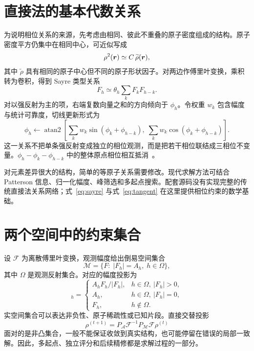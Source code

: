 \section{直接法的基本代数关系}
为说明相位关系的来源，先考虑由相同、彼此不重叠的原子密度组成的结构。原子密度平方仍集中在相同中心，可近似写成
\begin{equation}
\rho^2(\bm{r})\simeq C\,\widetilde\rho(\bm{r}),
\end{equation}
其中 $\widetilde\rho$ 具有相同的原子中心但不同的原子形状因子。对两边作傅里叶变换，乘积转为卷积，得到 Sayre 类型关系~\cite{sayre1952}
\begin{equation}
F_h\simeq\theta_h\sum_k F_kF_{h-k}.
\label{eq:sayre}
\end{equation}
对以强反射为主的项，右端复数向量之和的方向倾向于 $\phi_h$。令权重 $w_k$ 包含幅度与统计可靠度，切线更新形式为
\begin{equation}
\phi_h\leftarrow\operatorname{atan2}\left[
\sum_kw_k\sin(\phi_k+\phi_{h-k}),\;
\sum_kw_k\cos(\phi_k+\phi_{h-k})\right].
\label{eq:tangent}
\end{equation}
这一关系不把单条强反射变成独立的相位观测，而是把若干相位联结成三相位不变量。$\phi_h-\phi_k-\phi_{h-k}$ 中的整体原点相位相互抵消~\cite{direct_methods}。

对元素差异很大的结构，简单的等原子关系需要修改。现代求解方法可结合 Patterson 信息、归一化幅度、峰筛选和多起点搜索。配套源码没有实现完整的传统直接法关系网络；式~\eqref{eq:sayre} 与式~\eqref{eq:tangent} 在这里提供相位约束的数学基础。

\section{两个空间中的约束集合}
设 $\mathcal F$ 为离散傅里叶变换，观测幅度给出倒易空间集合
\begin{equation}
\mathcal M=\{F:\;|F_h|=A_h,\;h\in\Omega\},
\end{equation}
其中 $\Omega$ 是观测反射集合。对应的幅度投影为
\begin{equation}
[P_{\mathcal M}(F)]_h=
\begin{cases}
A_hF_h/|F_h|,&h\in\Omega,\ |F_h|>0,\\
A_h,&h\in\Omega,\ |F_h|=0,\\
F_h,&h\notin\Omega.
\end{cases}
\end{equation}
实空间集合可以表达非负性、原子稀疏性或已知片段。直接交替投影
\begin{equation}
\rho^{(t+1)}=P_{\mathcal A}\mathcal F^{-1}P_{\mathcal M}\mathcal F\rho^{(t)}
\end{equation}
面对的是非凸集合，一般不能保证收敛到真实结构，也可能停留在错误的局部一致解。因此，多起点、独立评分和后续精修都是求解过程的一部分。


